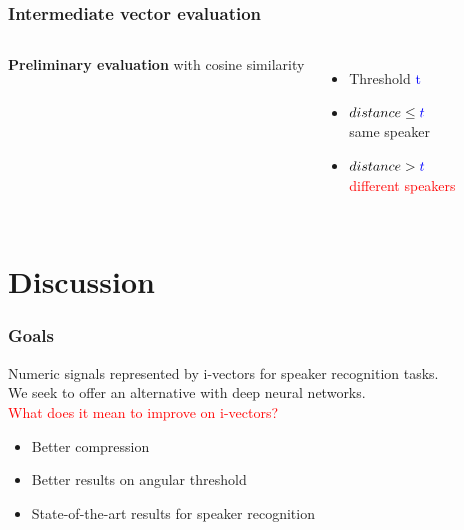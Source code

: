 \documentclass[11pt,english]{beamer}
\begin{document}
\begin{frame}
  \frametitle{Intermediate vector evaluation}
  \begin{columns}

   \textbf{Preliminary evaluation} with cosine similarity



    \begin{itemize}\setlength\itemsep{2em}
    \item[] Threshold \textcolor{blue}{t}
    \item[] $distance \leq \textcolor{blue}{t}$ \\
      \textcolor{mygreen}{same speaker}
    \item[] $distance > \textcolor{blue}{t}$ \\
      \textcolor{red}{different speakers}
    \end{itemize}


  \end{columns}

\end{frame}

\section{Discussion}

\begin{frame}
  \frametitle{Goals }
Numeric signals represented by i-vectors for speaker recognition
tasks.\\ We seek to offer an alternative with deep neural networks.\\
  \textcolor{red}{What does it mean to improve on i-vectors?}
  \begin{itemize}
\setlength\itemsep{1em}
  \item Better compression
  \item Better results on angular threshold
  \item State-of-the-art results for speaker recognition
  \end{itemize}
\end{frame}
\end{document}
